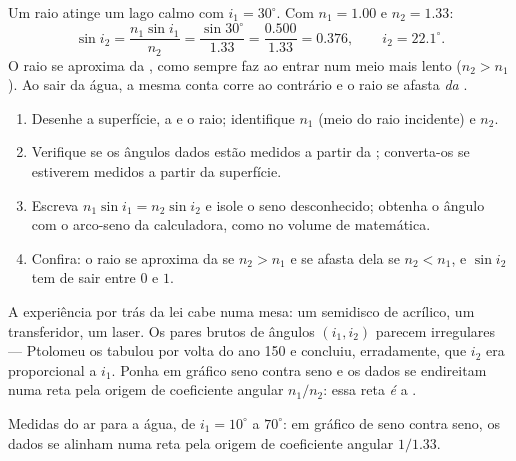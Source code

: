 \begin{example}\label{ex:g10:refraction:airwater}
Um raio atinge um lago calmo com $i_1 = 30^\circ$. Com $n_1 = 1.00$ e
$n_2 = 1.33$:
\[
\sin i_2 = \frac{n_1 \sin i_1}{n_2} = \frac{\sin 30^\circ}{1.33}
= \frac{0.500}{1.33} = 0.376,
\qquad
i_2 = 22.1^\circ .
\]
O raio se aproxima da , como sempre faz ao entrar num meio mais
lento ($n_2 > n_1$). Ao sair da água, a mesma conta corre ao contrário e
o raio se afasta \emph{da} .
\end{example}

\begin{method}\label{met:g10:refraction:method}
\begin{enumerate}
  \item Desenhe a superfície, a  e o raio; identifique $n_1$ (meio
        do raio incidente) e $n_2$.
  \item Verifique se os ângulos dados estão medidos a partir da ;
        converta-os se estiverem medidos a partir da superfície.
  \item Escreva $n_1 \sin i_1 = n_2 \sin i_2$ e isole o seno desconhecido;
        obtenha o ângulo com o arco-seno da calculadora, como no volume de
        matemática.
  \item Confira: o raio se aproxima da  se $n_2 > n_1$ e se afasta
        dela se $n_2 < n_1$, e $\sin i_2$ tem de sair entre $0$ e $1$.
\end{enumerate}
\end{method}

A experiência por trás da lei cabe numa mesa: um semidisco de acrílico,
um transferidor, um laser. Os pares brutos de ângulos $(i_1, i_2)$
parecem irregulares --- Ptolomeu os tabulou por volta do ano 150 e
concluiu, erradamente, que $i_2$ era proporcional a $i_1$. Ponha em
gráfico seno contra seno e os dados se endireitam numa reta pela origem
de coeficiente angular $n_1/n_2$: essa reta \emph{é} a .

\begin{omfigure}

{\small Medidas do ar para a água, de $i_1 = 10^\circ$ a $70^\circ$: em
gráfico de seno contra seno, os dados se alinham numa reta pela origem de
coeficiente angular $1/1.33$.}
\end{omfigure}

